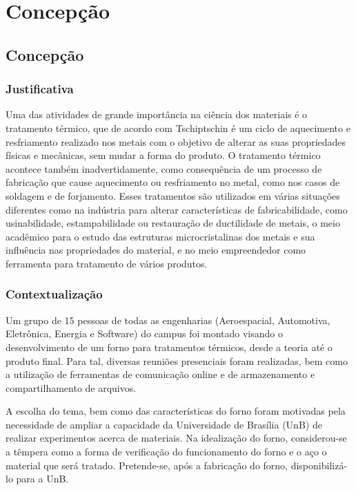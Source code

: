 \part{Concepção}

\chapter[Concepção]{Concepção}

\section{Justificativa}

Uma das atividades de grande importância na ciência dos materiais é o tratamento térmico, que de acordo com Tschiptschin é um ciclo de aquecimento e resfriamento realizado nos metais com o objetivo de alterar as suas propriedades físicas e mecânicas, sem mudar a forma do produto. O tratamento térmico acontece também inadvertidamente, como consequência de um processo de fabricação que cause aquecimento ou resfriamento no metal, como nos casos de soldagem e de forjamento. Esses tratamentos são utilizados em várias situações diferentes como na indústria para alterar características de fabricabilidade, como usinabilidade, estampabilidade ou restauração de ductilidade de metais, o meio acadêmico para o estudo das estruturas microcristalinas dos metais e sua influência nas propriedades do material, e no meio empreendedor como ferramenta para tratamento de vários produtos.

\section{Contextualização}

Um grupo de 15 pessoas de todas as engenharias (Aeroespacial, Automotiva, Eletrônica, Energia e Software) do campus foi montado visando o desenvolvimento de um forno para tratamentos térmicos, desde a teoria até o produto final. Para tal, diversas reuniões presenciais foram realizadas, bem como a utilização de ferramentas de comunicação online e de armazenamento e compartilhamento de arquivos. 

A escolha do tema, bem como das características do forno foram motivadas pela necessidade de ampliar a capacidade da Universidade de Brasília (UnB) de realizar experimentos acerca de materiais. Na idealização do forno, considerou-se a têmpera como a forma de verificação do funcionamento do forno e o aço o material que será tratado. Pretende-se, após a fabricação do forno, disponibilizá-lo para a UnB.

